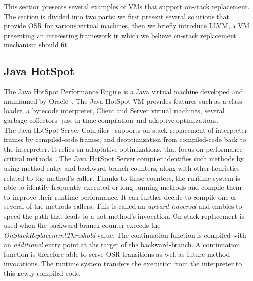 This section presents several examples of VMs that support on-stack replacement. 
The section is divided into two parts: we first present several solutions that provide OSR for various virtual machines, then we briefly introduce LLVM, a VM presenting an interesting framework in which we believe on-stack replacement mechanism should fit.\\ 

\subsection{Java HotSpot}\label{HotSpot}

The Java HotSpot Performance Engine\cite{HotspotPerfURL} is a Java virtual machine developed and maintained by Oracle~\cite{Oracle}.
The Java HotSpot VM provides features such as a class loader, a bytecode interpreter, Client and Server virtual machines, several garbage collectors, just-in-time compilation and adaptive optimizations.\\

The Java HotSpot Server Compiler~\cite{paleczny2001java} supports on-stack replacement of interpreter frames by compiled-code frames, and deoptimization from compiled-code back to the interpreter.
It relies on adaptative optimizations, that focus on performance critical methods~\cite{paleczny2001java, holzle1994third}.
The Java HotSpot Server compiler identifies such methods by using method-entry and backward-branch counters, along with other heuristics related to the method's caller.
Thanks to these counters, the runtime system is able to identify frequently executed or long running methods and compile them to improve their runtime performance.
It can further decide to compile one or several of the methods callers.
This is called an \textit{upward traversal} and enables to speed the path that leads to a hot method's invocation.  
On-stack replacement is used when the backward-branch counter exceeds the \textit{OnStackReplacementThreshold} value.
The continuation function is compiled with an \textit{additional} entry point at the target of the backward-branch.
A continuation function is therefore able to serve OSR transitions as well as future method invocations.
The runtime system transfers the execution from the interpreter to this newly compiled code.\\


